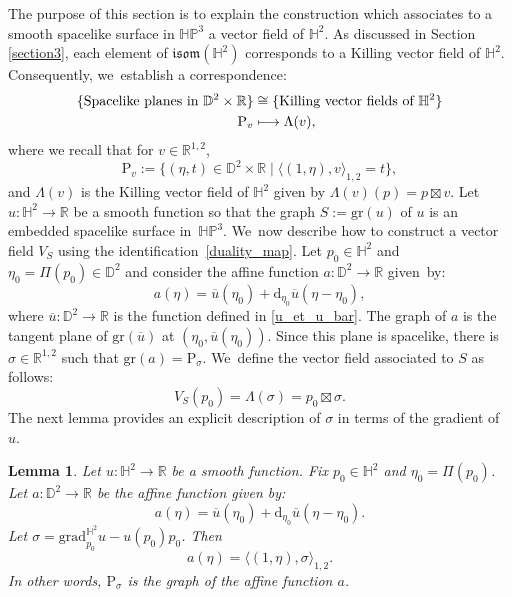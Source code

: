 \documentclass[JEP,XML,SOM,Unicode,NoEqCountersInSection, NoFloatCountersInSection,published]{cedram}
\newcommand\mto{\mathchoice{\longmapsto}{\mapsto}{\mapsto}{\mapsto}}
\theoremstyle{plain}
\newtheorem{lemma}[cor]{Lemma}
\theoremstyle{definition}
\newcommand{\minko}{\mathbb{R}^{1,2}}
\newcommand{\HP}{\mathbb{HP}^3}
\newcommand{\grad}{\mathrm{grad}^{\mathbb{H}^2}}
\newcommand{\inner}[1] {\langle #1 \rangle}
\begin{document}
The purpose of this section is to explain the construction which associates to a smooth spacelike surface in $\HP$ a vector field of $\mathbb{H}^2$. As discussed in Section \ref{section3}, each element of $\mathfrak{isom}(\mathbb{H}^2)$ corresponds to a Killing vector field of $\mathbb{H}^2$. Consequently, we~establish a correspondence:
\begin{equation}\label{duality_map}
\begin{aligned}
\{\text{Spacelike planes in } \mathbb{D}^2\times\mathbb{R}\} & \cong \{\text{Killing vector fields of } \mathbb{H}^2\} \\
\mathrm{P}_v& \mto \Lambda(v),
\end{aligned}
\end{equation}
where we recall that for $v\in\minko$,
\[
\mathrm{P}_v:=\{(\eta,t)\in\mathbb{D}^2\times\mathbb{R} \mid \langle (1,\eta),v \rangle_{1,2}=t \},
\]
and $\Lambda(v)$ is the Killing vector field of $\mathbb{H}^2$ given by $\Lambda(v)(p)=p\boxtimes v$.
Let $u:\mathbb{H}^2\to \mathbb{R}$ be a smooth function so that the graph $S:=\mathrm{gr}(u)$ of $u$ is an embedded spacelike surface in~$\HP$. We~now describe how to construct a vector field $V_S$ using the identification~\eqref{duality_map}. Let $p_0\in\mathbb{H}^2$ and $\eta_0=\Pi(p_0)\in \mathbb{D}^2$ and consider the affine function $a:\mathbb{D}^2\to \mathbb{R}$ given~by:
\[
a(\eta)=\overline{u}(\eta_0)+\mathrm{d}_{\eta_0}\overline{u}(\eta-\eta_0),
\]
where $\overline{u}: \mathbb{D}^2 \to \mathbb{R}$ is the function defined in \eqref{u_et_u_bar}.
The graph of $a$ is the tangent plane of $\mathrm{gr}(\overline{u})$ at $(\eta_0,\overline{u}(\eta_0))$. Since this plane is spacelike, there is $\sigma\in\minko$ such that $\mathrm{gr}(a)=\mathrm{P}_{\sigma}$. We~define the vector field associated to $S$ as follows:
\begin{equation}\label{XS}
V_S(p_0)=\Lambda(\sigma)= p_0\boxtimes \sigma.
\end{equation}
The next lemma provides an explicit description of $\sigma$ in terms of the gradient of $u$.

\begin{lemma}\label{sigma_lemma}
Let $u:\mathbb{H}^2\to\mathbb{R}$ be a smooth function. Fix $p_0\in\mathbb{H}^2$ and $\eta_0=\Pi(p_0)$. Let $a:\mathbb{D}^2\to \mathbb{R}$ be the affine function given by:
\[
a(\eta)=\overline{u}(\eta_0)+\mathrm{d}_{\eta_0}\overline{u}(\eta-\eta_0).
\]
Let $\sigma=\grad_{p_0}u-u(p_0)p_0$. Then
\[
a(\eta)=\inner{(1,\eta),\sigma}_{1,2}.
\]
In other words, $\mathrm{P}_{\sigma}$ is the graph of the affine function $a$.
\end{lemma}
\end{document}
